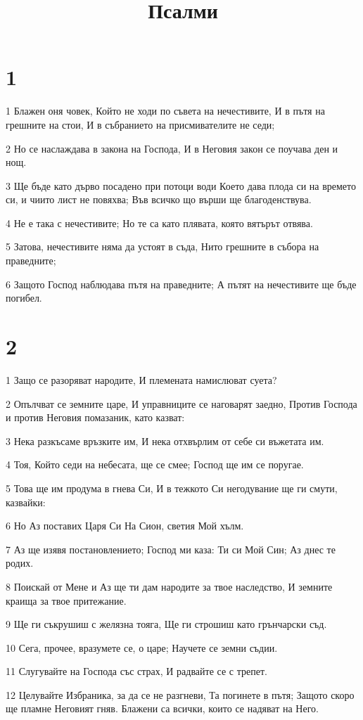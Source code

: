 

\title{Псалми}


\chapter{1}

\par 1 Блажен оня човек, Който не ходи по съвета на нечестивите, И в пътя на грешните на стои, И в събранието на присмивателите не седи;
\par 2 Но се наслаждава в закона на Господа, И в Неговия закон се поучава ден и нощ.
\par 3 Ще бъде като дърво посадено при потоци води Което дава плода си на времето си, и чиито лист не повяхва; Във всичко що върши ще благоденствува.
\par 4 Не е така с нечестивите; Но те са като плявата, която вятърът отвява.
\par 5 Затова, нечестивите няма да устоят в съда, Нито грешните в събора на праведните;
\par 6 Защото Господ наблюдава пътя на праведните; А пътят на нечестивите ще бъде погибел.

\chapter{2}

\par 1 Защо се разоряват народите, И племената намислюват суета?
\par 2 Опълчват се земните царе, И управниците се наговарят заедно, Против Господа и против Неговия помазаник, като казват:
\par 3 Нека разкъсаме връзките им, И нека отхвърлим от себе си въжетата им.
\par 4 Тоя, Който седи на небесата, ще се смее; Господ ще им се поругае.
\par 5 Това ще им продума в гнева Си, И в тежкото Си негодувание ще ги смути, казвайки:
\par 6 Но Аз поставих Царя Си На Сион, светия Мой хълм.
\par 7 Аз ще изявя постановлението; Господ ми каза: Ти си Мой Син; Аз днес те родих.
\par 8 Поискай от Мене и Аз ще ти дам народите за твое наследство, И земните краища за твое притежание.
\par 9 Ще ги съкрушиш с желязна тояга, Ще ги строшиш като грънчарски съд.
\par 10 Сега, прочее, вразумете се, о царе; Научете се земни съдии.
\par 11 Слугувайте на Господа със страх, И радвайте се с трепет.
\par 12 Целувайте Избраника, за да се не разгневи, Та погинете в пътя; Защото скоро ще пламне Неговият гняв. Блажени са всички, които се надяват на Него.

